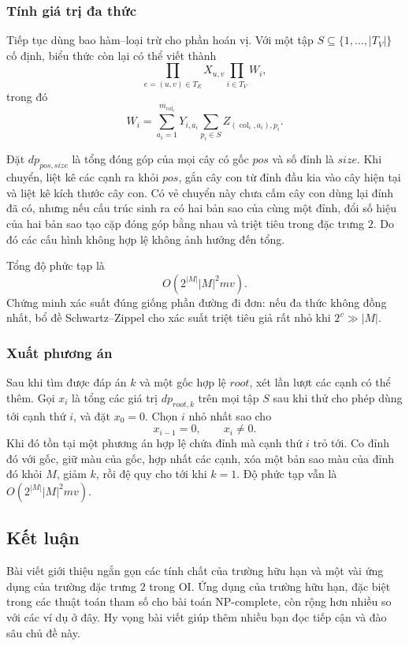 \documentclass[11pt]{article}
\begin{document}
\subsubsection{Tính giá trị đa thức}

Tiếp tục dùng bao hàm--loại trừ cho phần hoán vị. Với một tập \(S\subseteq
\{1,\ldots,|T_V|\}\) cố định, biểu thức còn lại có thể viết thành
\[
  \prod_{e=(u,v)\in T_E}X_{u,v}\prod_{i\in T_V}W_i,
\]
trong đó
\[
  W_i=\sum_{a_i=1}^{m_{\operatorname{col}_i}}Y_{i,a_i}
      \sum_{p_i\in S}Z_{(\operatorname{col}_i,a_i),p_i}.
\]

Đặt \(dp_{\mathit{pos},\mathit{size}}\) là tổng đóng góp của mọi cây có gốc
\(\mathit{pos}\) và số đỉnh là \(\mathit{size}\). Khi chuyển, liệt kê các cạnh
ra khỏi \(\mathit{pos}\), gắn cây con từ đỉnh đầu kia vào cây hiện tại và liệt
kê kích thước cây con. Có vẻ chuyển này chưa cấm cây con dùng lại đỉnh đã có,
nhưng nếu cấu trúc sinh ra có hai bản sao của cùng một đỉnh, đổi số hiệu của
hai bản sao tạo cặp đóng góp bằng nhau và triệt tiêu trong đặc trưng \(2\). Do
đó các cấu hình không hợp lệ không ảnh hưởng đến tổng.

Tổng độ phức tạp là
\[
  O(2^{|M|}|M|^2mv).
\]
Chứng minh xác suất đúng giống phần đường đi đơn: nếu đa thức không đồng nhất,
bổ đề Schwartz--Zippel cho xác suất triệt tiêu giả rất nhỏ khi \(2^v\gg |M|\).

\subsubsection{Xuất phương án}

Sau khi tìm được đáp án \(k\) và một gốc hợp lệ \(\mathit{root}\), xét lần lượt
các cạnh có thể thêm. Gọi \(x_i\) là tổng các giá trị
\(dp_{\mathit{root},k}\) trên mọi tập \(S\) sau khi thử cho phép dùng tới cạnh
thứ \(i\), và đặt \(x_0=0\). Chọn \(i\) nhỏ nhất sao cho
\[
  x_{i-1}=0,\qquad x_i\ne 0.
\]
Khi đó tồn tại một phương án hợp lệ chứa đỉnh mà cạnh thứ \(i\) trỏ tới. Co đỉnh
đó với gốc, giữ màu của gốc, hợp nhất các cạnh, xóa một bản sao màu của đỉnh
đó khỏi \(M\), giảm \(k\), rồi đệ quy cho tới khi \(k=1\). Độ phức tạp vẫn là
\(O(2^{|M|}|M|^2mv)\).

\subsection{Kết luận}

Bài viết giới thiệu ngắn gọn các tính chất của trường hữu hạn và một vài ứng
dụng của trường đặc trưng \(2\) trong OI. Ứng dụng của trường hữu hạn, đặc biệt
trong các thuật toán tham số cho bài toán NP-complete, còn rộng hơn nhiều so
với các ví dụ ở đây. Hy vọng bài viết giúp thêm nhiều bạn đọc tiếp cận và đào
sâu chủ đề này.
\end{document}
